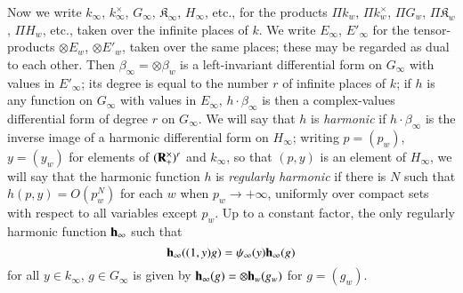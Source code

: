 Now we write $k_{\infty}$, $k^{\times}_{\infty}$, $G_{\infty}$, $\mathfrak{K}_{\infty}$, $H_{\infty}$, etc., for the products $\Pi k_{w}$, $\Pi k^{\times}_{w}$, $\Pi G_{w}$, $\Pi \mathfrak{K}_{w}$, $\Pi H_{w}$, etc., taken over the infinite places of $k$. We write $E_{\infty}$, $E'_{\infty}$ for the tensor-products $\otimes E_{w}$, $\otimes E'_{w}$, taken over the same places; these may be regarded as dual to each other. Then $\beta_{\infty}=\otimes \beta_{w}$ is a left-invariant differential form on $G_{\infty}$ with values in $E'_{\infty}$; its degree is equal to the number $r$ of infinite places of $k$; if $h$ is any function on $G_{\infty}$ with values in $E_{\infty}$, $h\cdot \beta_{\infty}$ is then a complex-values differential form of degree $r$ on $G_{\infty}$. We will say that $h$ is {\em harmonic} if $h\cdot \beta_{\infty}$ is the inverse image of a harmonic differential form on $H_{\infty}$; writing $p=(p_{w})$, $y=(y_{w})$ for elements of $(\mathbf{R}^{\times}_{+})^{r}$ and $k_{\infty}$, so that $(p,y)$ is an element of $H_{\infty}$, we will say that the harmonic function $h$ is {\em regularly harmonic} if there is $N$ such that $h(p,y)=O(p^{N}_{w})$ for each $w$ when $p_{w}\to +\infty$, uniformly over compact sets with respect to all variables except $p_{w}$. Up to a constant factor, the only regularly harmonic function $\mathbf{h}_{\infty}$ such that
$$
\mathbf{h}_{\infty}((1,y)g)=\psi_{\infty}(y)\mathbf{h}_{\infty}(g)
$$
for all $y\in k_{\infty}$, $g\in G_{\infty}$ is given by $\mathbf{h}_{\infty}(g)=\otimes \mathbf{h}_{w}(g_{w})$ for $g=(g_{w})$.

